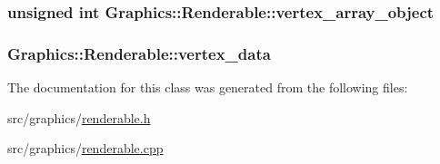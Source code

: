 \subsubsection[{vertex\+\_\+array\+\_\+object}]{\setlength{\rightskip}{0pt plus 5cm}unsigned int Graphics\+::\+Renderable\+::vertex\+\_\+array\+\_\+object\hspace{0.3cm}{\ttfamily [private]}}\label{class_graphics_1_1_renderable_aabfa91ebff7b10decd54119d663044ef}
\hypertarget{class_graphics_1_1_renderable_a5077fe6a71021f0bd4ebc8d24cdf544b}{}
\subsubsection[{vertex\+\_\+data}]{ Graphics\+::\+Renderable\+::vertex\+\_\+data\hspace{0.3cm}{\ttfamily [private]}}\label{class_graphics_1_1_renderable_a5077fe6a71021f0bd4ebc8d24cdf544b}


The documentation for this class was generated from the following files\+:\begin{DoxyCompactItemize}
\item 
src/graphics/\hyperlink{renderable_8h}{renderable.\+h}\item 
src/graphics/\hyperlink{renderable_8cpp}{renderable.\+cpp}\end{DoxyCompactItemize}
